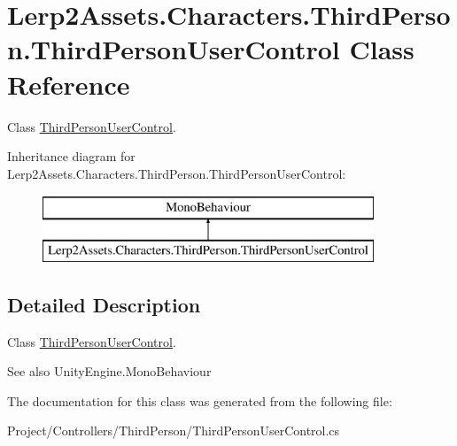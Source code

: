 \hypertarget{class_lerp2_assets_1_1_characters_1_1_third_person_1_1_third_person_user_control}{}\section{Lerp2\+Assets.\+Characters.\+Third\+Person.\+Third\+Person\+User\+Control Class Reference}
\label{class_lerp2_assets_1_1_characters_1_1_third_person_1_1_third_person_user_control}


Class \hyperlink{class_lerp2_assets_1_1_characters_1_1_third_person_1_1_third_person_user_control}{Third\+Person\+User\+Control}.  


Inheritance diagram for Lerp2\+Assets.\+Characters.\+Third\+Person.\+Third\+Person\+User\+Control\+:\begin{figure}[H]
\begin{center}
\leavevmode
\includegraphics[height=2.000000cm]{class_lerp2_assets_1_1_characters_1_1_third_person_1_1_third_person_user_control}
\end{center}
\end{figure}


\subsection{Detailed Description}
Class \hyperlink{class_lerp2_assets_1_1_characters_1_1_third_person_1_1_third_person_user_control}{Third\+Person\+User\+Control}. 

\begin{DoxySeeAlso}{See also}
Unity\+Engine.\+Mono\+Behaviour


\end{DoxySeeAlso}


The documentation for this class was generated from the following file\+:\begin{DoxyCompactItemize}
\item 
Project/\+Controllers/\+Third\+Person/Third\+Person\+User\+Control.\+cs\end{DoxyCompactItemize}
